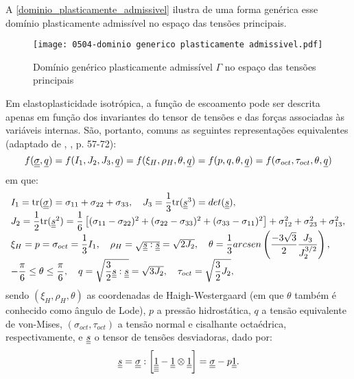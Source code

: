 A \autoref{dominio_plasticamente_admissivel} ilustra de uma forma genérica esse domínio plasticamente admissível no espaço das tensões principais.
\begin{figure}[H]
	\begin{center}
		\texttt{[image: 0504-dominio generico plasticamente admissivel.pdf]}
	\end{center}
	\caption{\label{dominio_plasticamente_admissivel}Domínio genérico plasticamente admissível $\Gamma$ no espaço das tensões principais}
\end{figure}
Em elastoplasticidade isotrópica, a função de escoamento pode ser descrita apenas em função dos invariantes do tensor de tensões e das forças associadas às variáveis internas. São, portanto, comuns as seguintes representações equivalentes (adaptado de \citeauthor{Chen1988}, \citeyear{Chen1988}, p. 57-72):
\begin{equation}
	\label{eq:funcoes_escoamento}
	f(\underline{\underline \sigma},\underline q) = f(I_1,J_2,J_3,\underline q) = f(\xi_{H},\rho_{H},\theta,\underline q) = f(p,q,\theta,\underline q) = f(\sigma_{oct},\tau_{oct},\theta,\underline q)
\end{equation}
em que:
\begin{equation}
	\label{eq:invariantes_tensores}
		\begin{array}{lcl}
			I_1 = \text{tr}(\underline{\underline \sigma}) = \sigma_{11}+\sigma_{22}+\sigma_{33},~~~ J_3 = \dfrac{1}{3}\text{tr}(\underline{\underline s}^3) = det(\underline{\underline s}), \\ 
			J_2 = \dfrac{1}{2}\text{tr}(\underline{\underline s}^2) = \dfrac{1}{6}\left[ (\sigma_{11}-\sigma_{22})^2 + (\sigma_{22}-\sigma_{33})^2 + (\sigma_{33}-\sigma_{11})^2 \right] + \sigma_{12}^2+ \sigma_{23}^2+ \sigma_{13}^2, \\
			\xi_{H} = p = \sigma_{oct} = \dfrac{1}{3}I_1, ~~~ \rho_{H} = \sqrt{\underline{\underline s}:\underline{\underline s}} = \sqrt{2J_2}, ~~~ \theta = \dfrac{1}{3}arcsen\left( \dfrac{-3\sqrt{3}}{2} \dfrac{J_3}{J_2^{3/2}} \right), \\
			-\dfrac{\pi}{6} \le \theta \le \dfrac{\pi}{6}, ~~~ q = \sqrt{\dfrac{3}{2}\underline{\underline s}:\underline{\underline s}} = \sqrt{3J_2}, ~~~ \tau_{oct} = \sqrt{\dfrac{3}{2}J_2},
	\end{array}
\end{equation}
sendo $(\xi_H,\rho_H,\theta)$ as coordenadas de Haigh-Westergaard (em que $\theta$ também é conhecido como ângulo de Lode), $p$ a pressão hidrostática, $q$ a tensão equivalente de von-Mises, $(\sigma_{oct},\tau_{oct})$ a tensão normal e cisalhante octaédrica, respectivamente, e $\underline{\underline s}$  o tensor de tensões desviadoras, dado por:
\begin{equation}
	\label{eq:tensor_desviador}
	\underline{\underline s} = \underline{\underline \sigma}: \left[ \underline{\underline{\underline{\underline 1}}}-\underline{\underline 1} \otimes \underline{\underline 1} \right] = \underline{\underline \sigma} - p\underline{\underline 1}.
\end{equation}

